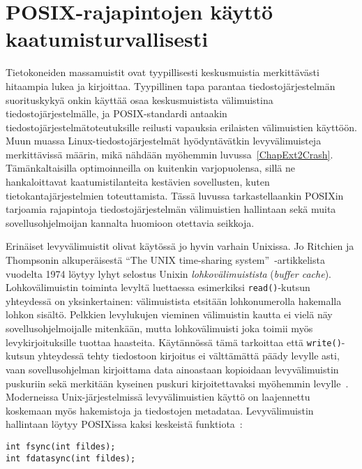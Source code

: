 \section{POSIX-rajapintojen käyttö kaatumisturvallisesti}
\label{ChapPosixDataConsistency}
Tietokoneiden massamuistit ovat tyypillisesti keskusmuistia merkittävästi hitaampia lukea ja kirjoittaa.
Tyypillinen tapa parantaa tiedostojärjestelmän suorituskykyä onkin käyttää osaa keskusmuistista välimuistina tiedostojärjestelmälle,
ja POSIX-standardi antaakin tiedostojärjestelmätoteutuksille reilusti vapauksia erilaisten välimuistien käyttöön.
Muun muassa Linux-tiedostojärjestelmät hyödyntävätkin levyvälimuisteja merkittävissä määrin,
mikä nähdään myöhemmin luvussa~\ref{ChapExt2Crash}.
Tämänkaltaisilla optimoinneilla on kuitenkin varjopuolensa,
sillä ne hankaloittavat kaatumistilanteita kestävien sovellusten, kuten tietokantajärjestelmien toteuttamista.
Tässä luvussa tarkastellaankin POSIXin tarjoamia rajapintoja tiedostojärjestelmän välimuistien hallintaan sekä muita sovellusohjelmoijan kannalta huomioon otettavia seikkoja.

Erinäiset levyvälimuistit olivat käytössä jo hyvin varhain Unixissa.
Jo Ritchien ja Thompsonin alkuperäisestä ``The UNIX time-sharing system''~\cite{UnixPaper}-artikkelista vuodelta 1974 löytyy lyhyt selostus Unixin \emph{lohkovälimuistista} (\emph{buffer cache}).
Lohkovälimuistin toiminta levyltä luettaessa esimerkiksi \texttt{read()}-kutsun yhteydessä on yksinkertainen:
välimuistista etsitään lohkonumerolla hakemalla lohkon sisältö.
Pelkkien levylukujen vieminen välimuistin kautta ei vielä näy sovellusohjelmoijalle mitenkään,
mutta lohkovälimuisti joka toimii myös levykirjoituksille tuottaa haasteita.
Käytännössä tämä tarkoittaa että \texttt{write()}-kutsun yhteydessä tehty tiedostoon kirjoitus ei välttämättä päädy levylle asti,
vaan sovellusohjelman kirjoittama data ainoastaan kopioidaan levyvälimuistin puskuriin sekä merkitään kyseinen puskuri kirjoitettavaksi myöhemmin levylle~\cite{UnixPaper}.
Moderneissa Unix-järjestelmissä levyvälimuistien käyttö on laajennettu koskemaan myös hakemistoja ja tiedostojen metadataa.
%
%
Levyvälimuistin hallintaan löytyy POSIXissa kaksi keskeistä funktiota~\cite{PosixSpec}:
\begin{verbatim}
int fsync(int fildes);
int fdatasync(int fildes);
\end{verbatim}

